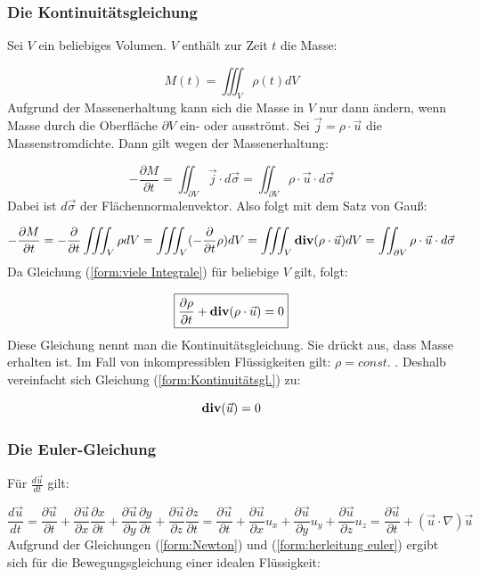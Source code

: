 \subsubsection{Die Kontinuitätsgleichung}
Sei $ V $ ein beliebiges Volumen. $V$ enthält zur Zeit $t$ die Masse:

\begin{equation}
M(t) = \iiint_V \rho (t) dV
\end{equation}
Aufgrund der Massenerhaltung kann sich die Masse in $V$ nur dann ändern, wenn Masse durch die Oberfläche $ \partial V $ ein- oder ausströmt. Sei $ \vec{j} = \rho \cdot \vec{u} $ die Massenstromdichte. Dann gilt wegen der Massenerhaltung:

\begin{equation}
-\frac{\partial M}{\partial t} = \iint_{\partial V} \vec{j} \cdot d \vec{\sigma} = \iint_{\partial V} \rho \cdot \vec{u} \cdot d \vec{\sigma}
\end{equation}
Dabei ist $ d \vec{\sigma} $ der Flächennormalenvektor. Also folgt mit dem Satz von Gauß:

\begin{equation}
-\frac{\partial M}{\partial t} = -\frac{\partial}{\partial t} \iiint_V \rho dV = \iiint_V (-\frac{\partial}{\partial t} \rho) dV = \iiint_V {\bf div}(\rho \cdot \vec{u})dV = \iint_{\partial V} \rho \cdot \vec{u} \cdot d \vec{\sigma}
\label{form:viele Integrale}
\end{equation}
Da Gleichung (\ref{form:viele Integrale}) für beliebige $V$ gilt, folgt:

\begin{equation}
\boxed{\frac{\partial \rho}{\partial t} + {\bf div}(\rho \cdot \vec{u}) = 0}
\label{form:Kontinuitätsgl.}
\end{equation}
Diese Gleichung nennt man die Kontinuitätsgleichung. Sie drückt aus, dass Masse erhalten ist. Im Fall von inkompressiblen Flüssigkeiten gilt: $ \rho = const. $ . Deshalb vereinfacht sich Gleichung (\ref{form:Kontinuitätsgl.}) zu:

\begin{equation}
{\bf div}(\vec{u}) = 0
\end{equation}

\subsubsection{Die Euler-Gleichung}
Für $ \frac{d \vec{u}}{dt} $ gilt:

\begin{equation}
\frac{d \vec{u}}{dt} = \frac{\partial \vec{u}}{\partial t} + \frac{\partial \vec{u}}{\partial x} \frac{\partial x}{\partial t} + \frac{\partial \vec{u}}{\partial y} \frac{\partial y}{\partial t} + \frac{\partial \vec{u}}{\partial z} \frac{\partial z}{\partial t} = \frac{\partial \vec{u}}{\partial t} + \frac{\partial \vec{u}}{\partial x} u_x + \frac{\partial \vec{u}}{\partial y} u_y + \frac{\partial \vec{u}}{\partial z} u_z = \frac{\partial \vec{u}}{\partial t} + (\vec{u} \cdot \nabla) \vec{u}
\label{form:herleitung euler}
\end{equation}
Aufgrund der Gleichungen (\ref{form:Newton}) und (\ref{form:herleitung euler}) ergibt sich für die Bewegungsgleichung einer idealen Flüssigkeit:

